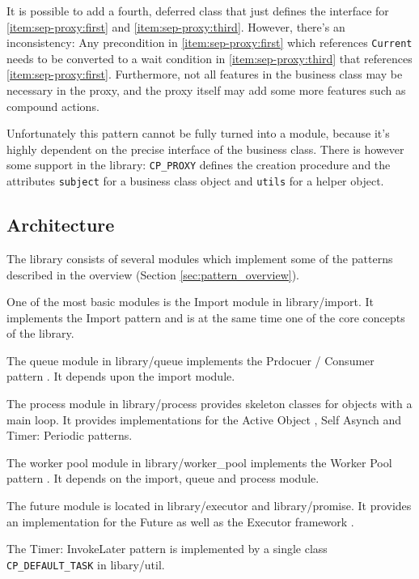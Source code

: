 \documentclass[a4paper,10pt]{article}
\newcommand{\dir} [1] [] {#1}
\newcommand{\todoref}{\todo{ref}}
\begin{document}
It is possible to add a fourth, deferred class that just defines the interface for \ref{item:sep-proxy:first} and \ref{item:sep-proxy:third}.
However, there's an inconsistency: 
Any precondition in \ref{item:sep-proxy:first} which references \lstinline!Current! needs to be converted to a wait condition in \ref{item:sep-proxy:third} that references \ref{item:sep-proxy:first}.
Furthermore, not all features in the business class may be necessary in the proxy, and the proxy itself may add some more features such as compound actions.

Unfortunately this pattern cannot be fully turned into a module, because it's highly dependent on the precise interface of the business class.
There is however some support in the library: 
\lstinline!CP_PROXY! defines the creation procedure and the attributes \lstinline!subject! for a business class object and \lstinline!utils! for a helper object.


\subsection {Architecture}
\label{sec:modules}

The library consists of several modules which implement some of the patterns described in the overview (Section \ref{sec:pattern_overview}).

One of the most basic modules is the Import module in \dir{library/import}.
It implements the Import pattern \todoref and is at the same time one of the core concepts of the library.

The queue module in \dir{library/queue} implements the Prdocuer / Consumer pattern \todoref.
It depends upon the import module.

The process module in \dir{library/process} provides skeleton classes for objects with a main loop.
It provides implementations for the Active Object \todoref, Self Asynch \todoref and Timer: Periodic \todoref patterns.

The worker pool module in \dir{library/worker\_pool} implements the Worker Pool pattern \todoref.
It depends on the import, queue and process module.

The future module is located in \dir{library/executor} and \dir{library/promise}.
It provides an implementation for the Future \todoref as well as the Executor framework \todoref.

The Timer: InvokeLater pattern \todoref is implemented by a single class \lstinline!CP_DEFAULT_TASK! in \dir{libary/util}.
\end{document}
